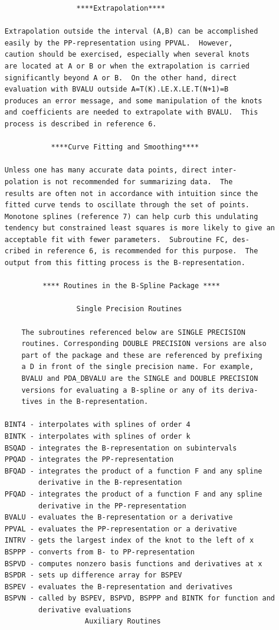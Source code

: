 \documentclass[11pt,twoside]{article}
\begin{document}
\begin{verbatim}
                      ****Extrapolation****

     Extrapolation outside the interval (A,B) can be accomplished
     easily by the PP-representation using PPVAL.  However,
     caution should be exercised, especially when several knots
     are located at A or B or when the extrapolation is carried
     significantly beyond A or B.  On the other hand, direct
     evaluation with BVALU outside A=T(K).LE.X.LE.T(N+1)=B
     produces an error message, and some manipulation of the knots
     and coefficients are needed to extrapolate with BVALU.  This
     process is described in reference 6.

                ****Curve Fitting and Smoothing****

     Unless one has many accurate data points, direct inter-
     polation is not recommended for summarizing data.  The
     results are often not in accordance with intuition since the
     fitted curve tends to oscillate through the set of points.
     Monotone splines (reference 7) can help curb this undulating
     tendency but constrained least squares is more likely to give an
     acceptable fit with fewer parameters.  Subroutine FC, des-
     cribed in reference 6, is recommended for this purpose.  The
     output from this fitting process is the B-representation.

              **** Routines in the B-Spline Package ****

                      Single Precision Routines

         The subroutines referenced below are SINGLE PRECISION
         routines. Corresponding DOUBLE PRECISION versions are also
         part of the package and these are referenced by prefixing
         a D in front of the single precision name. For example,
         BVALU and PDA_DBVALU are the SINGLE and DOUBLE PRECISION
         versions for evaluating a B-spline or any of its deriva-
         tives in the B-representation.

     BINT4 - interpolates with splines of order 4
     BINTK - interpolates with splines of order k
     BSQAD - integrates the B-representation on subintervals
     PPQAD - integrates the PP-representation
     BFQAD - integrates the product of a function F and any spline
             derivative in the B-representation
     PFQAD - integrates the product of a function F and any spline
             derivative in the PP-representation
     BVALU - evaluates the B-representation or a derivative
     PPVAL - evaluates the PP-representation or a derivative
     INTRV - gets the largest index of the knot to the left of x
     BSPPP - converts from B- to PP-representation
     BSPVD - computes nonzero basis functions and derivatives at x
     BSPDR - sets up difference array for BSPEV
     BSPEV - evaluates the B-representation and derivatives
     BSPVN - called by BSPEV, BSPVD, BSPPP and BINTK for function and
             derivative evaluations
                        Auxiliary Routines


\end{verbatim}
\end{document}
